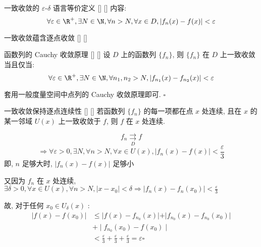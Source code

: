 \documentclass[UTF8]{ctexart}
\begin{document}
			\begin{ppt}
			    []
			    {一致收敛的 \(\varepsilon\)-\(\delta\) 语言等价定义}
			    []
			    []
				内容: 
				\[\forall\varepsilon\in\R^+, \exists N\in\N, \forall n>N, \forall x\in D, |f_n(x)-f(x)|<\varepsilon\]
			\end{ppt}

			\begin{ppt}
			    []
			    {一致收敛蕴含逐点收敛}
			    []
			    []
			\end{ppt}

			\begin{ppt}
			    []
			    {函数列的 Cauchy 收敛原理}
			    []
			    []
				设 \(D\) 上的函数列 \(\{f_n\}\), 则 \(\{f_n\}\) 在 \(D\) 上一致收敛当且仅当: 
				\[\forall\varepsilon\in\R^+, \exists N\in\N, \forall n_1,n_2>N, |f_{n_1}(x)-f_{n_2}(x)|<\varepsilon\]
			\end{ppt}

			\begin{prf}
				套用一般度量空间中点列的 Cauchy 收敛原理即可. \(\square\)
			\end{prf}
			
			\begin{ppt}
			    []
			    {一致收敛保持逐点连续性}
			    []
			    []
				若函数列 \(\{f_n\}\) 的每一项都在点 \(x\) 处连续, 且在 \(x\) 的某一邻域 \(U(x)\) 上一致收敛于 \(f\), 则 \(f\) 在 \(x\) 处连续. 
			\end{ppt}

			\begin{prf}
				\[f_n\underset{D}{\rightrightarrows} f\]
				\[\Longrightarrow\forall\varepsilon>0, \exists N, \forall n>N, \forall x\in U(x), \left|f_n(x)-f(x)\right|<\frac{\varepsilon}{3}\]
				即, \(n\) 足够大时, \(\left|f_n(x)-f(x)\right|\) 足够小

				又因为 \(f_n\) 在 \(x\) 处连续, \(\exists\delta>0, \forall x\in U(x), \forall n>N, \left|x-x_0\right|<\delta\Rightarrow\left|f_n(x)-f_n(x_0)\right|<\frac{\varepsilon}{3}\)

				故, 对于任何 \(x_0\in U_{\delta}(x)\) :
				\[\begin{aligned}
					\vert f(x)-f(x_{0})\vert & \leq\vert f(x)-f_{n_{0}}(x)\vert+\vert f_{n_{0}}(x)-f_{n_{0}}(x_{0})\vert \\
					 & +\mid f_{n_{0}}(x_{0})-f(x_{0})\mid \\
					 & <\frac{\varepsilon}{3}+\frac{\varepsilon}{3}+\frac{\varepsilon}{3}=\varepsilon\square
				\end{aligned}\]
			\end{prf}
\end{document}

